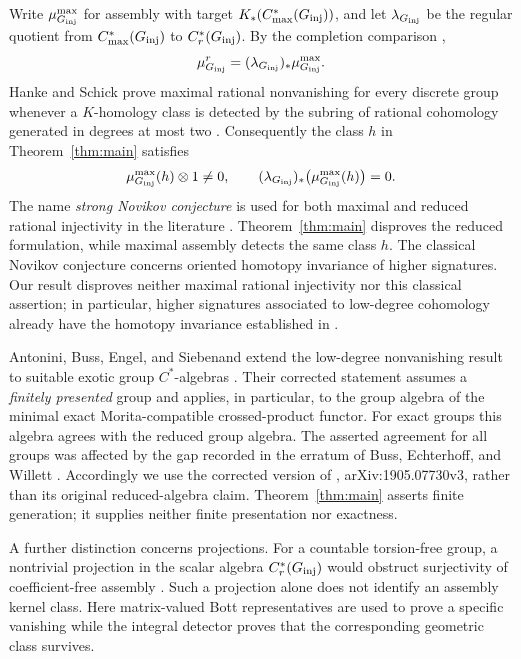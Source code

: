 Write $\mu_{G_{\mathrm{inj}}}^{\max}$ for assembly with target $K_*(C^*_{\max}(G_{\mathrm{inj}}))$,
and let $\lambda_{G_{\mathrm{inj}}}$ be the regular quotient from $C^*_{\max}(G_{\mathrm{inj}})$ to
$C_r^*(G_{\mathrm{inj}})$.  By the completion comparison
\cite[Remark~2.6]{Land15},
\[
  \mu_{G_{\mathrm{inj}}}^r=(\lambda_{G_{\mathrm{inj}}})_*\mu_{G_{\mathrm{inj}}}^{\max}.
\]
Hanke and Schick prove maximal rational nonvanishing for every discrete
group whenever a $K$-homology class is detected by the subring of rational
cohomology generated in degrees at most two
\cite[Theorem~1.2]{HS08}.  Consequently the class $h$ in
Theorem~\ref{thm:main} satisfies
\[
  \mu_{G_{\mathrm{inj}}}^{\max}(h)\otimes1\ne0,
  \qquad
  (\lambda_{G_{\mathrm{inj}}})_*\bigl(\mu_{G_{\mathrm{inj}}}^{\max}(h)\bigr)=0.
\]
The name \emph{strong Novikov conjecture} is used for both maximal and
reduced rational injectivity in the literature
\cite[Section~7]{BCH94}\cite[Section~8.3, footnote~6]{BGW16}.
Theorem~\ref{thm:main} disproves the reduced formulation, while maximal
assembly detects the same class $h$. The classical Novikov conjecture
concerns oriented homotopy invariance of higher signatures. Our result
disproves neither maximal rational injectivity nor this classical
assertion; in particular, higher signatures associated to
low-degree cohomology already have the homotopy invariance established in
\cite[Corollary~1.3]{HS08}.

Antonini, Buss, Engel, and Siebenand extend the low-degree nonvanishing
result to suitable exotic group $C^*$-algebras
\cite[Theorem~B]{ABES21}.  Their corrected statement assumes a
\emph{finitely presented} group and applies, in particular, to the group
algebra of the minimal exact Morita-compatible crossed-product functor.
For exact groups this algebra agrees with the reduced group algebra.
The asserted agreement for all groups was affected by the gap recorded
in the erratum of Buss, Echterhoff, and Willett \cite{BEW21err}.
Accordingly we use the corrected version of \cite{ABES21},
arXiv:1905.07730v3, rather than its original reduced-algebra claim.
Theorem~\ref{thm:main} asserts finite generation; it supplies neither
finite presentation nor exactness.

A further distinction concerns projections.  For a countable
torsion-free group, a nontrivial projection in the scalar algebra
$C_r^*(G_{\mathrm{inj}})$ would obstruct surjectivity of coefficient-free assembly
\cite[Corollary~1.6]{KP22}.  Such a projection alone does not identify
an assembly kernel class.  Here matrix-valued Bott representatives are
used to prove a specific vanishing while the integral detector proves
that the corresponding geometric class survives.

